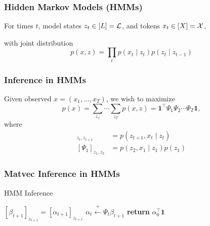 \documentclass{beamer}
\begin{document}
\begin{frame}
\frametitle{Hidden Markov Models (HMMs)}

For times $t$, model states $z_t \in [L] = \mathcal{L}$, and tokens $x_t \in [X] = \mathcal{X}$,

\vspace{1em}

\begin{center}
\end{center}

\vspace{1em}
with joint distribution
$$p(x,z) = \prod_t p(x_t \mid z_t)p(z_t \mid z_{t-1})$$
\end{frame}

\begin{frame}
\frametitle{Inference in HMMs}
Given observed $x = (x_1, \ldots, x_T)$,
\vspace{1em}
we wish to maximize
\begin{equation*}
p(x)
= \sum_{z_1}\cdots\sum_{z_T}p(x, z)
= \bm1^\top\Psi_1\Psi_2\cdots\Psi_T\bm1,
\end{equation*}
where
\begin{align*}
[\Psi_{t}]_{z_t,z_{t+1}} &= p(z_{t+1},x_t \mid z_t)\\
[\Psi_{1}]_{z_1,z_2} &= p(z_2,x_1 \mid z_1)p(z_1)
\end{align*}
\end{frame}

\begin{frame}
\frametitle{Matvec Inference in HMMs}

\begin{algorithm}[H]
\caption{HMM Inference}
\begin{algorithmic}
\STATE $[\beta_{t+1}]_{z_{t+1}} = [\alpha_{t+1}]_{z_{t+1}}$
\ENDFOR
\STATE $\alpha_t \stackrel{+}{\gets} \Psi_t \beta_{t+1}$
\ENDFOR
\STATE \textbf{return} $\alpha_0^\top \mathbf{1}$
\end{algorithmic}
\end{algorithm}
\end{frame}
\end{document}
